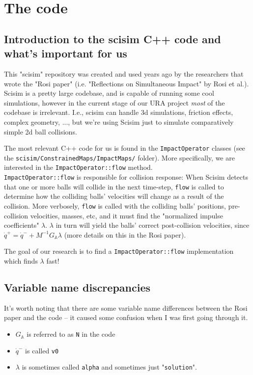 \documentclass[12pt]{article}
\newcommand{\GA}{G_{\mathbb{A}}}
\begin{document}
\section{The code}

\subsection{Introduction to the scisim C++ code and what's important for us}

This "scisim" repository was created and used years ago by the researchers that wrote the "Rosi paper"
(i.e. "Reflections on Simultaneous Impact" by Rosi et al.).
Scisim is a pretty large codebase, and is capable of running some cool simulations,
however in the current stage of our URA project \textit{most} of the codebase is irrelevant.
I.e., scisim can handle 3d simulations, friction effects, complex geometry, ...,
but we're using Scisim just to simulate comparatively simple 2d ball collisions.

The most relevant C++ code for us is found in the \texttt{ImpactOperator}
classes (see the \texttt{scisim/ConstrainedMaps/ImpactMaps/} folder).
More specifically, we are interested in the \texttt{ImpactOperator::flow} method.
\\\texttt{ImpactOperator::flow} is responsible for collision response:
When Scisim detects that one or more balls will collide in the next time-step, \texttt{flow} is called
to determine how the colliding balls' velocities will change as a result of the collision.
More verbosely, \texttt{flow} is called with the colliding balls' positions, pre-collision velocities, masses, etc,
and it must find the "normalized impulse coefficients" $\lambda$.
$\lambda$ in turn will yield the balls' correct post-collision velocities,
since $\dot{q}^+ = \dot{q}^- + M^{-1} \GA{} \lambda$ (more details on this in the Rosi paper).

The goal of our research is to find a \texttt{ImpactOperator::flow} implementation which finds $\lambda$ fast!

\subsection{Variable name discrepancies}


It's worth noting that there are some variable name differences between the Rosi paper and the code
-- it caused some confusion when I was first going through it.
\begin{itemize}
    \item $\GA{}$ is referred to as \texttt{N} in the code
    \item $\dot{q}^-$ is called \texttt{v0}
    \item $\lambda$ is sometimes called \texttt{alpha} and sometimes just "\texttt{solution}".
\end{itemize}
\end{document}
